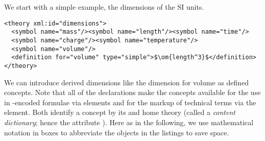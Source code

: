 We start with a simple example, the dimensions of the SI units.

\begin{lstlisting}[label=lst:concepts,mathescape,
  caption={Introducing Basic Concepts in a {\omdoc} Theory},
  index={theory,symbol}]
<theory xml:id="dimensions">
  <symbol name="mass"/><symbol name="length"/><symbol name="time"/>
  <symbol name="charge"/><symbol name="temperature"/>
  <symbol name="volume"/>
  <definition for="volume" type="simple">$\om{length^3}$</definition>
</theory>
\end{lstlisting}
We can introduce derived dimensions like the dimension for volume as defined
concepts. Note that all of the {} declarations make the concepts available
for the use in {\openmath}-encoded formulae via {} elements and for the
markup of technical terms via the {\omdoc} {} element. Both identify a
concept by its {} and home theory (called a {\emph{content
    dictionary}}; hence the attribute {}). Here as in the following, we
use mathematical notation in boxes to abbreviate the {\openmath} objects in the listings
to save space.

